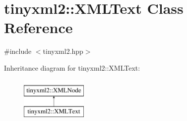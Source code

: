 \hypertarget{classtinyxml2_1_1_x_m_l_text}{\section{tinyxml2\-:\-:X\-M\-L\-Text Class Reference}
\label{classtinyxml2_1_1_x_m_l_text}
}


{\ttfamily \#include $<$tinyxml2.\-hpp$>$}

Inheritance diagram for tinyxml2\-:\-:X\-M\-L\-Text\-:\begin{figure}[H]
\begin{center}
\leavevmode
\includegraphics[height=2.000000cm]{classtinyxml2_1_1_x_m_l_text}
\end{center}
\end{figure}
